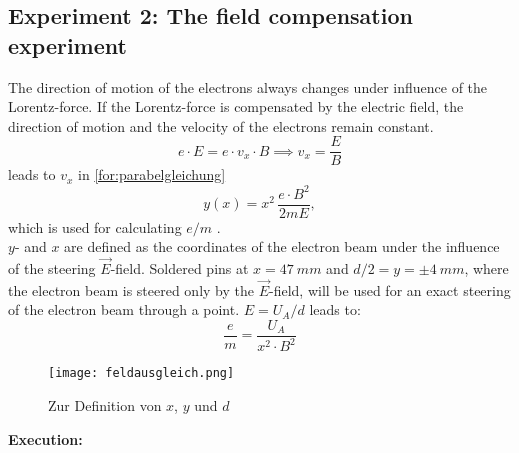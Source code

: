 \documentclass{tudphygp_eng}
\begin{document}
\subsection{Experiment 2: The field compensation experiment}
  The direction of motion of the electrons always changes under influence of the Lorentz-force. 
	If the Lorentz-force is compensated by the electric field, the direction of motion and the velocity of the electrons remain constant.  
  \begin{equation}
    e\cdot E = e\cdot v_x\cdot B \implies v_x=\frac{E}{B}
    \label{for:v_x}
  \end{equation}
  leads to $v_x$ in \eqref{for:parabelgleichung}
  \begin{equation}
    y(x) = x^2\,\frac{e\cdot B^2}{2mE},
  \end{equation}
  which is used for calculating $e/m$ .\\
	$y$- and $x$ are defined as the coordinates of the electron beam under the influence of the steering $\vec E$-field. Soldered pins at $x=\SI{47}{mm}$ and $d/2=y=\pm\SI{4}{mm}$, where the electron beam is steered only by the $\vec E$-field, will be used for an exact steering of the electron beam through a point. 
  $E=U_A/d$ leads to:
  \begin{equation}
    \frac{e}{m} = \frac{U_A}{x^2\cdot B^2}
  \end{equation}
  \begin{figure}
    \centering
    \texttt{[image: feldausgleich.png]}
    \caption{Zur Definition von $x$, $y$ und $d$}
  \end{figure}
  \textbf{Execution:}
\end{document}
